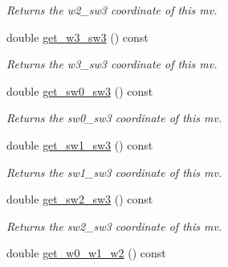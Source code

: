 \begin{DoxyCompactItemize}
\begin{DoxyCompactList}\small\item\em Returns the w2\-\_\-sw3 coordinate of this mv. \end{DoxyCompactList}\item 
\hypertarget{classe3ga_1_1mv_a1ace48fe779f49755cf1c84086fcb2a6}{double \hyperlink{classe3ga_1_1mv_a1ace48fe779f49755cf1c84086fcb2a6}{get\-\_\-w3\-\_\-sw3} () const }\label{classe3ga_1_1mv_a1ace48fe779f49755cf1c84086fcb2a6}

\begin{DoxyCompactList}\small\item\em Returns the w3\-\_\-sw3 coordinate of this mv. \end{DoxyCompactList}\item 
\hypertarget{classe3ga_1_1mv_a40a53b23e33f8ab78e01c46b0add7cc7}{double \hyperlink{classe3ga_1_1mv_a40a53b23e33f8ab78e01c46b0add7cc7}{get\-\_\-sw0\-\_\-sw3} () const }\label{classe3ga_1_1mv_a40a53b23e33f8ab78e01c46b0add7cc7}

\begin{DoxyCompactList}\small\item\em Returns the sw0\-\_\-sw3 coordinate of this mv. \end{DoxyCompactList}\item 
\hypertarget{classe3ga_1_1mv_a7ef3cab3f78098858fbb93c0970f6a4f}{double \hyperlink{classe3ga_1_1mv_a7ef3cab3f78098858fbb93c0970f6a4f}{get\-\_\-sw1\-\_\-sw3} () const }\label{classe3ga_1_1mv_a7ef3cab3f78098858fbb93c0970f6a4f}

\begin{DoxyCompactList}\small\item\em Returns the sw1\-\_\-sw3 coordinate of this mv. \end{DoxyCompactList}\item 
\hypertarget{classe3ga_1_1mv_ab6e8c1ac9e1094eebe5bb792d41b6955}{double \hyperlink{classe3ga_1_1mv_ab6e8c1ac9e1094eebe5bb792d41b6955}{get\-\_\-sw2\-\_\-sw3} () const }\label{classe3ga_1_1mv_ab6e8c1ac9e1094eebe5bb792d41b6955}

\begin{DoxyCompactList}\small\item\em Returns the sw2\-\_\-sw3 coordinate of this mv. \end{DoxyCompactList}\item 
\hypertarget{classe3ga_1_1mv_a66609f36ca7a547e3fa5ae2da1db9af2}{double \hyperlink{classe3ga_1_1mv_a66609f36ca7a547e3fa5ae2da1db9af2}{get\-\_\-w0\-\_\-w1\-\_\-w2} () const }\label{classe3ga_1_1mv_a66609f36ca7a547e3fa5ae2da1db9af2}


\end{DoxyCompactItemize}
